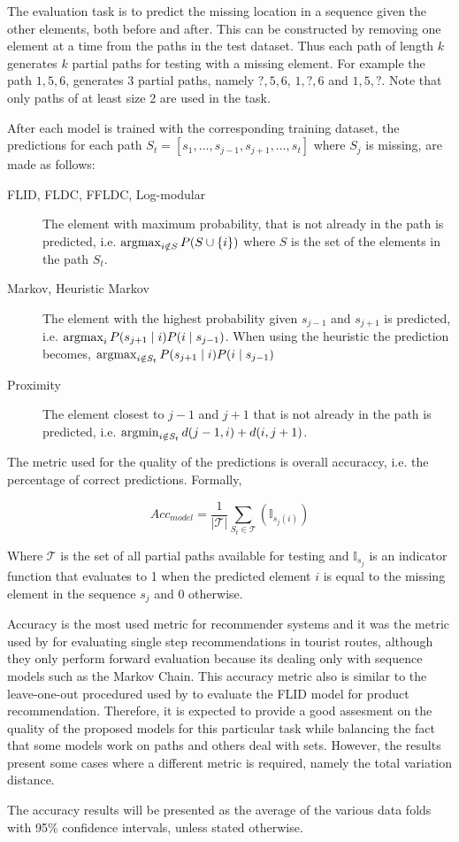 The evaluation task is to predict the missing location in a sequence given the other elements, both before and after. This can be constructed by removing one element at a time from the paths in the test dataset. Thus each path of length $k$ generates $k$ partial paths for testing with a missing element. For example the path $1,5,6$, generates 3 partial paths, namely $?,5,6$, $1,?,6$ and $1,5,?$. Note that only paths of at least size 2 are used in the task.

After each model is trained with the corresponding training dataset, the predictions for each path $S_{t} = [s_{1}, \dots, s_{j-1}, s_{j+1}, \dots, s_{t}]$ where $S_{j}$ is missing, are made as follows:

\begin{description}
  \item[FLID, FLDC, FFLDC, Log-modular] The element with maximum probability, that is not already in the path is predicted, i.e. $\operatorname*{argmax}_{i \notin S} P(S \cup \{i\})$ where $S$ is the set of the elements in the path $S_{t}$.
  \item[Markov, Heuristic Markov] The element with the highest probability given $s_{j-1}$ and $s_{j+1}$ is predicted, i.e. $\operatorname*{argmax}_{i} P(s_{j+1} \mid i)P(i \mid s_{j-1})$. When using the heuristic the prediction becomes, $\operatorname*{argmax}_{i \notin S_{t}} P(s_{j+1} \mid i)P(i \mid s_{j-1})$
  \item[Proximity] The element closest to $j-1$ and $j+1$ that is not already in the path is predicted, i.e. $\operatorname*{argmin}_{i \notin S_{t}}d(j-1, i) + d(i, j+1)$.
\end{description}

The metric used for the quality of the predictions is overall accuraccy, i.e. the percentage of correct predictions. Formally, 

\begin{equation}
  Acc_{model} = \frac{1}{|\mathcal{T}|}\sum_{S_{t} \in \mathcal{T}}(\mathbb{I}_{s_{j}(i)})
\end{equation}

Where $\mathcal{T}$ is the set of all partial paths available for testing and $\mathbb{I}_{s_{j}}$ is an indicator function that evaluates to 1 when the predicted element $i$ is equal to the missing element in the sequence $s_{j}$ and 0 otherwise.

Accuracy is the most used metric for recommender systems \citep{Herlocker2004} and it was the metric used by \citet{Kurashima2010} for evaluating single step recommendations in tourist routes, although they only perform forward evaluation because its dealing only with sequence models such as the Markov Chain. This accuracy metric also is similar to the leave-one-out procedured used by \citet{tschiatschek16learning} to evaluate the FLID model for product recommendation. Therefore, it is expected to provide a good assesment on the quality of the proposed models for this particular task while balancing the fact that some models work on paths and others deal with sets. However, the results present some cases where a different metric is required, namely the total variation distance.

The accuracy results will be presented as the average of the various data folds with 95\% confidence intervals, unless stated otherwise.
